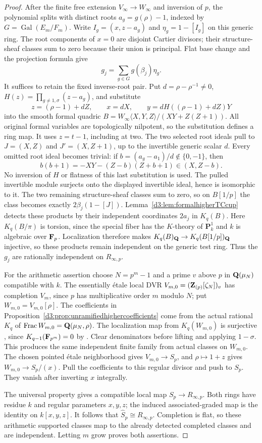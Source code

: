 \begin{proof}
After the finite free extension $V_\infty\to W_\infty$ and
inversion of $p$, the polynomial splits with distinct roots
$a_g=g(\rho)-1$, indexed by
$G=\operatorname{Gal}(E_m/F_m)$.
Write $I_g=(x,z-a_g)$ and $\eta_g=1-[I_g]$ on this generic ring.
The root components of $x=0$ are disjoint Cartier divisors;
their structure-sheaf classes sum to zero because their union is
principal. Flat base change and the projection formula give
\[
 g_j=\sum_{g\in G}g(\beta_j)\eta_g.
\]
It suffices to retain the fixed inverse-root pair.
Put $d=\rho-\rho^{-1}\ne0$,
$H(z)=\prod_{g\ne1,\sigma}(z-a_g)$, and substitute
\[
 z=(\rho-1)+dZ,\qquad x=dX,\qquad
 y=dH((\rho-1)+dZ)Y
\]
into the smooth formal quadric
$B=W_\infty\langle X,Y,Z\rangle/(XY+Z(Z+1))$.
All original formal variables are topologically nilpotent, so the
substitution defines a ring map. It uses $z=t-1$, including at two.
The two selected root ideals pull to $J=(X,Z)$ and $J'=(X,Z+1)$,
up to the invertible generic scalar $d$.
Every omitted root ideal becomes trivial: if
$b=(a_g-a_1)/d\notin\{0,-1\}$, then
\[
 b(b+1)=-XY-(Z-b)(Z+b+1)\in(X,Z-b).
\]
No inversion of $H$ or flatness of this last substitution is used.
The pulled invertible module surjects onto the displayed invertible
ideal, hence is isomorphic to it.
The two remaining structure-sheaf classes sum to zero, so on
$B[1/p]$ the class becomes exactly
$2\beta_j(1-[J])$.
Lemma~\ref{d3:lem:formalhigherTCcup} detects these products by their
independent coordinates $2a_j$ in $K_q(B)$.
Here $K_q(B/\pi)$ is torsion, since the special fiber has the
$K$-theory of $\mathbf P^1_k$ and $k$ is algebraic over $\mathbf F_p$.
Localization therefore makes $K_q(B)_{\mathbf Q}\to K_q(B[1/p])_{\mathbf Q}$
injective, so these products remain independent on the generic
test ring.
Thus the $g_j$ are rationally independent on $R_{\infty,p}$.

For the arithmetic assertion choose $N=p^m-1$ and a prime $v$
above $p$ in $\mathbf Q(\mu_N)$ compatible with $k$.
The essentially \'etale local DVR
$V_{m,0}=(\mathbf Z_{(p)}[\zeta_N])_v$ has completion $V_m$, since
$p$ has multiplicative order $m$ modulo $N$; put $W_{m,0}=V_{m,0}[\rho]$.
The coefficients in Proposition~\ref{d3:prop:unramifiedhighercoefficients}
come from the actual rational $K_q$ of
$\operatorname{Frac} W_{m,0}=\mathbf Q(\mu_N,\rho)$.
The localization map from $K_q(W_{m,0})$ is surjective
\cite[Sections~5--7]{Quillen}, since
$K_{q-1}(\mathbf F_{p^m})=0$ by
\cite{QuillenFinite}\cite[IV, Corollary~1.13]{Weibel}.
Clear denominators before lifting and applying $1-\sigma$.
This produces the same independent finite family from actual
classes on $W_{m,0}$.
The chosen pointed \'etale neighborhood gives $V_{m,0}\to S_p$,
and $\rho\mapsto1+z$ gives
$W_{m,0}\to S_p/(x)$.
Pull the coefficients to this regular divisor and push to $S_p$.
They vanish after inverting $x$ integrally.

The universal property gives a compatible local map
$S_p\to R_{\infty,p}$.
Both rings have residue $k$ and regular parameters $x,y,z$;
the induced associated-graded map is the identity on $k[x,y,z]$.
It follows that $\widehat S_p\cong R_{\infty,p}$.
Completion is flat, so these arithmetic supported classes map to
the already detected completed classes and are independent.
Letting $m$ grow proves both assertions.
\end{proof}


